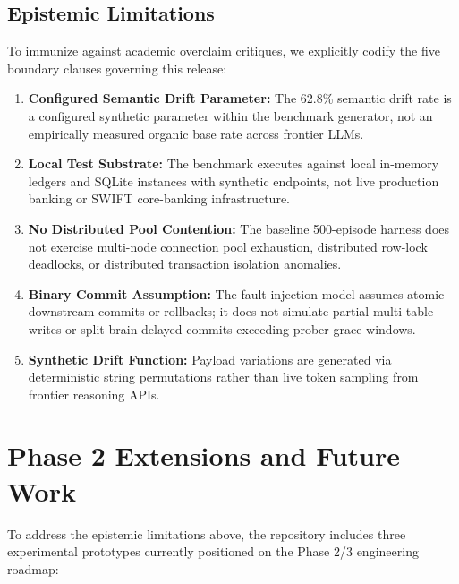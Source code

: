 \documentclass[10pt,journal,compsoc]{IEEEtran}
\begin{document}
\subsection{Epistemic Limitations}
To immunize against academic overclaim critiques, we explicitly codify the five boundary clauses governing this release:
\begin{enumerate}
    \item \textbf{Configured Semantic Drift Parameter:} The 62.8\% semantic drift rate is a configured synthetic parameter within the benchmark generator, not an empirically measured organic base rate across frontier LLMs.
    \item \textbf{Local Test Substrate:} The benchmark executes against local in-memory ledgers and SQLite instances with synthetic endpoints, not live production banking or SWIFT core-banking infrastructure.
    \item \textbf{No Distributed Pool Contention:} The baseline 500-episode harness does not exercise multi-node connection pool exhaustion, distributed row-lock deadlocks, or distributed transaction isolation anomalies.
    \item \textbf{Binary Commit Assumption:} The fault injection model assumes atomic downstream commits or rollbacks; it does not simulate partial multi-table writes or split-brain delayed commits exceeding prober grace windows.
    \item \textbf{Synthetic Drift Function:} Payload variations are generated via deterministic string permutations rather than live token sampling from frontier reasoning APIs.
\end{enumerate}

\section{Phase 2 Extensions and Future Work}
To address the epistemic limitations above, the repository includes three experimental prototypes currently positioned on the Phase 2/3 engineering roadmap:
\end{document}
